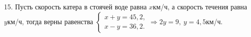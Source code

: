 15. Пусть скорость катера в стоячей воде равна $x$км/ч, а скорость течения равна $y$км/ч, тогда верны равенства $\begin{cases} x+y=45,2,\\ x-y=36,2.\end{cases}
\Rightarrow 2y=9,\ y=4,5$км/ч.\\
